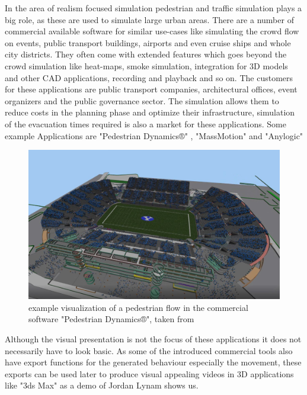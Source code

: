 \documentclass[sigconf]{acmart}
\begin{document}
In the area of realism focused simulation pedestrian and traffic simulation plays a big role, as these are used to simulate large urban areas. There are a number of commercial available software for similar use-cases like simulating the crowd flow on events, public transport buildings, airports and even cruise ships and whole city districts. They often come with extended features which goes beyond the crowd simulation like heat-maps, smoke simulation, integration for 3D models and other CAD applications, recording and playback and so on. The customers for these applications are public transport companies, architectural offices, event organizers and the public governance sector. The simulation allows them to reduce costs in the planning phase and optimize their infrastructure, simulation of the evacuation times required is also a market for these applications.  Some example Applications are "Pedestrian Dynamics®" \cite{pedestrian_dynamics_pedestrian_2020}, "MassMotion"  \cite{mediaworks_pedestrian_2020} and "Anylogic" \cite{anylogic_website}

\begin{figure}[h]
  \centering
  \includegraphics[width=1\linewidth]{images/PedestrianDynamicsStadionExample.png}
  \caption{example visualization of a pedestrian flow in the commercial software "Pedestrian Dynamics®",  taken from \cite{pedestrian_dynamics_pedestrian_2020}}
  \label{fig:stadionEvacuationExample}
\end{figure}

Although the visual presentation is not the focus of these applications it does not necessarily have to look basic. As some of the introduced commercial tools also have export functions for the generated behaviour especially the movement, these exports can be used later to produce visual appealing videos in 3D applications like "3ds Max" as a demo of Jordan Lynam shows us. \cite{lynamJordan_viissim_3ds_max}
\end{document}
